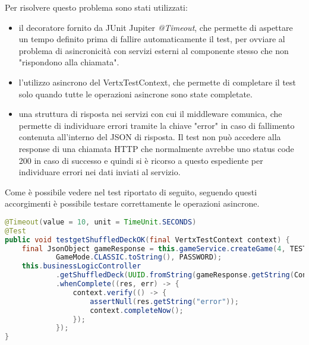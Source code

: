 Per risolvere questo problema sono stati utilizzati:
\begin{itemize}
    \item il decoratore fornito da JUnit Jupiter \textit{@Timeout}, che permette di aspettare un tempo definito prima di fallire automaticamente il test, per ovviare al problema di asincronicità con servizi esterni al componente stesso che non "rispondono alla chiamata".
    \item l'utilizzo asincrono del VertxTestContext, che permette di completare il test solo quando tutte le operazioni asincrone sono state completate.
    \item una struttura di risposta nei servizi con cui il middleware comunica, che permette di individuare errori tramite la chiave "error" in caso di fallimento contenuta all'interno del JSON di risposta. Il test non può accedere alla response di una chiamata HTTP che normalmente avrebbe uno status code 200 in caso di successo e quindi si è ricorso a questo espediente per individuare errori nei dati inviati al servizio.
\end{itemize}

Come è possibile vedere nel test riportato di seguito, seguendo questi accorgimenti è possibile testare correttamente le operazioni asincrone.

\begin{lstlisting}[language=Java, caption={Vertx test asincrono}, label=list:test_async_vertx]
@Timeout(value = 10, unit = TimeUnit.SECONDS)
@Test
public void testgetShuffledDeckOK(final VertxTestContext context) {
    final JsonObject gameResponse = this.gameService.createGame(4, TEST_USER, 41,
            GameMode.CLASSIC.toString(), PASSWORD);
    this.businessLogicController
            .getShuffledDeck(UUID.fromString(gameResponse.getString(Constants.GAME_ID)), 4)
            .whenComplete((res, err) -> {
                context.verify(() -> {
                    assertNull(res.getString("error"));
                    context.completeNow();
                });
            });
}
\end{lstlisting}

